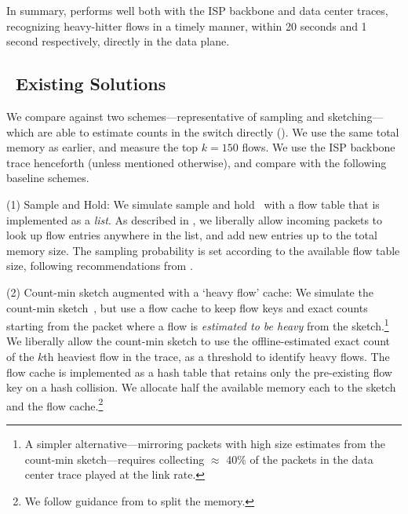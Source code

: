

In summary, \TheSystem performs well both with the ISP backbone and data center
traces, recognizing heavy-hitter flows in a timely manner, \ie within 20 seconds
and 1 second respectively, directly in the data plane.

\subsection{\TheSystem\ \vs Existing Solutions}\label{subsec:comparisonRelated}

 We compare \TheSystem against two
schemes---representative of sampling and sketching---which are able to estimate
counts in the switch directly (). We use the same total memory
as earlier, and measure the top $k = 150$ flows. We use the ISP backbone trace
henceforth (unless mentioned otherwise),
and compare \TheSystem with the following baseline schemes.

\noindent (1) Sample and Hold: We simulate sample and hold~\cite{estan2002new}
with a flow table that is implemented as a {\em list}.  As described in
, we liberally allow incoming packets to look up flow entries
anywhere in the list, and add new entries up to the total memory size. The
sampling probability is set according to the available flow table size,
following recommendations from \cite{estan2002new}.

\noindent (2) Count-min sketch augmented with a `heavy flow' cache: We simulate
the count-min sketch~\cite{cormode2005improved}, but use a flow cache to keep
flow keys and exact counts starting from the packet where a flow is {\em
  estimated to be heavy} from the sketch.\footnote{A simpler
  alternative---mirroring packets with high size estimates from the count-min
  sketch---requires collecting $\approx$ 40\% of the packets in the data center
  trace played at the link rate.}
%
We liberally allow the count-min
sketch to use the offline-estimated exact count of the $k$th heaviest
flow in the trace, as a threshold to identify heavy flows. The flow cache is
implemented as a hash table that retains only the pre-existing flow key on a
hash collision. We allocate half the available memory each to the sketch and the
flow cache.\footnote{We follow guidance from \cite[page
    288]{estan2002new} to split the memory.}

